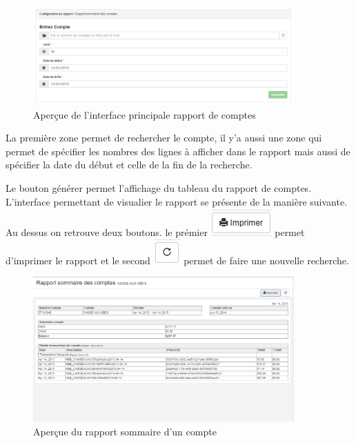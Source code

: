 \documentclass[12pt,a4paper]{report}
\begin{document}
\begin{figure}[h]
\begin{center}
\includegraphics[width=10cm]{pic/RapCompte.png}
\end{center}
\caption{Aperçue de l'interface principale rapport de comptes}
\label{Aperçue de l'interface principale rapport de comptes}
\end{figure}

La première zone permet de rechercher le compte, il y'a aussi une zone qui permet de spécifier les nombres des lignes à afficher dans le rapport mais aussi de spécifier la date du début et celle de la fin de la recherche. 


Le bouton générer permet l'affichage du tableau du rapport de comptes. L'interface permettant de visualier le rapport se présente de la manière suivante. Au dessus on retrouve deux boutons. le prémier 
\includegraphics[scale=0.7]{pic/Print.png} permet d'imprimer le rapport et le second \includegraphics[scale=0.7]{pic/refresh.png} permet de faire une nouvelle recherche.

\begin{figure}[h]
\begin{center}
\includegraphics[width=10cm]{pic/RappSomComptes.png}
\end{center}
\caption{Aperçue du rapport sommaire d'un compte}
\label{Aperçue du rapport sommaire d'un compte}
\end{figure}
\end{document}
